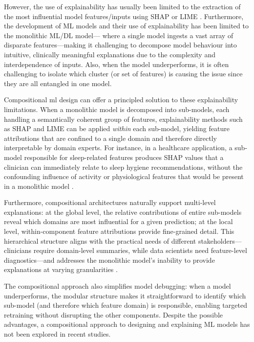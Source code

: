 However, the use of explainability has usually been limited to the extraction of the most influential model features/inputs using SHAP or LIME \cite{byeon_advances_2023}. Furthermore, the development of ML models and their use of explainability has been limited to the monolithic ML/DL model— where a single model ingests a vast array of disparate features—making it challenging to decompose model behaviour into intuitive, clinically meaningful explanations due to the complexity and interdependence of inputs. Also, when the model underperforms, it is often challenging to isolate which cluster (or set of features) is causing the issue since they are all entangled in one model.

Compositional \gls{ml} design can offer a principled solution to these explainability limitations. When a monolithic model is decomposed into sub-models, each handling a semantically coherent group of features, explainability methods such as SHAP \cite{lundberg_unified_2017} and LIME \cite{ribeiro_why_2016} can be applied \emph{within} each sub-model, yielding feature attributions that are confined to a single domain and therefore directly interpretable by domain experts. For instance, in a healthcare application, a sub-model responsible for sleep-related features produces SHAP values that a clinician can immediately relate to sleep hygiene recommendations, without the confounding influence of activity or physiological features that would be present in a monolithic model \cite{joyce_explainable_2023, kamath_introduction_2021}. 

Furthermore, compositional architectures naturally support multi-level explanations: at the global level, the relative contributions of entire sub-models reveal which domains are most influential for a given prediction; at the local level, within-component feature attributions provide fine-grained detail. This hierarchical structure aligns with the practical needs of different stakeholders---clinicians require domain-level summaries, while data scientists need feature-level diagnostics---and addresses the monolithic model's inability to provide explanations at varying granularities \cite{molnar_interpretable_nodate, barredo_arrieta_explainable_2020}. 

The compositional approach also simplifies model debugging: when a model underperforms, the modular structure makes it straightforward to identify which sub-model (and therefore which feature domain) is responsible, enabling targeted retraining without disrupting the other components. Despite the possible advantages, a compositional approach to designing and explaining ML models has not been explored in recent studies. 

